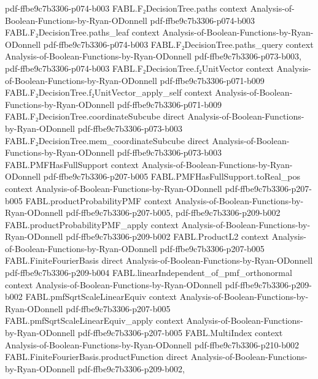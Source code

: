 \begin{theorem}
  {pdf-ffbe9c7b3306-p074-b003}
\proofstep
  {FABL.F₂DecisionTree.paths}
  {context}
  {Analysis-of-Boolean-Functions-by-Ryan-ODonnell}
  {pdf-ffbe9c7b3306-p074-b003}
\proofstep
  {FABL.F₂DecisionTree.paths_leaf}
  {context}
  {Analysis-of-Boolean-Functions-by-Ryan-ODonnell}
  {pdf-ffbe9c7b3306-p074-b003}
\proofstep
  {FABL.F₂DecisionTree.paths_query}
  {context}
  {Analysis-of-Boolean-Functions-by-Ryan-ODonnell}
  {pdf-ffbe9c7b3306-p073-b003,
    pdf-ffbe9c7b3306-p074-b003}
\proofstep
  {FABL.F₂DecisionTree.f₂UnitVector}
  {context}
  {Analysis-of-Boolean-Functions-by-Ryan-ODonnell}
  {pdf-ffbe9c7b3306-p071-b009}
\proofstep
  {FABL.F₂DecisionTree.f₂UnitVector_apply_self}
  {context}
  {Analysis-of-Boolean-Functions-by-Ryan-ODonnell}
  {pdf-ffbe9c7b3306-p071-b009}
\proofstep
  {FABL.F₂DecisionTree.coordinateSubcube}
  {direct}
  {Analysis-of-Boolean-Functions-by-Ryan-ODonnell}
  {pdf-ffbe9c7b3306-p073-b003}
\proofstep
  {FABL.F₂DecisionTree.mem_coordinateSubcube}
  {direct}
  {Analysis-of-Boolean-Functions-by-Ryan-ODonnell}
  {pdf-ffbe9c7b3306-p073-b003}
\proofstep
  {FABL.PMFHasFullSupport}
  {context}
  {Analysis-of-Boolean-Functions-by-Ryan-ODonnell}
  {pdf-ffbe9c7b3306-p207-b005}
\proofstep
  {FABL.PMFHasFullSupport.toReal_pos}
  {context}
  {Analysis-of-Boolean-Functions-by-Ryan-ODonnell}
  {pdf-ffbe9c7b3306-p207-b005}
\proofstep
  {FABL.productProbabilityPMF}
  {context}
  {Analysis-of-Boolean-Functions-by-Ryan-ODonnell}
  {pdf-ffbe9c7b3306-p207-b005,
    pdf-ffbe9c7b3306-p209-b002}
\proofstep
  {FABL.productProbabilityPMF_apply}
  {context}
  {Analysis-of-Boolean-Functions-by-Ryan-ODonnell}
  {pdf-ffbe9c7b3306-p209-b002}
\proofstep
  {FABL.ProductL2}
  {context}
  {Analysis-of-Boolean-Functions-by-Ryan-ODonnell}
  {pdf-ffbe9c7b3306-p207-b005}
\proofstep
  {FABL.FiniteFourierBasis}
  {direct}
  {Analysis-of-Boolean-Functions-by-Ryan-ODonnell}
  {pdf-ffbe9c7b3306-p209-b004}
\proofstep
  {FABL.linearIndependent_of_pmf_orthonormal}
  {context}
  {Analysis-of-Boolean-Functions-by-Ryan-ODonnell}
  {pdf-ffbe9c7b3306-p209-b002}
\proofstep
  {FABL.pmfSqrtScaleLinearEquiv}
  {context}
  {Analysis-of-Boolean-Functions-by-Ryan-ODonnell}
  {pdf-ffbe9c7b3306-p207-b005}
\proofstep
  {FABL.pmfSqrtScaleLinearEquiv_apply}
  {context}
  {Analysis-of-Boolean-Functions-by-Ryan-ODonnell}
  {pdf-ffbe9c7b3306-p207-b005}
\proofstep
  {FABL.MultiIndex}
  {context}
  {Analysis-of-Boolean-Functions-by-Ryan-ODonnell}
  {pdf-ffbe9c7b3306-p210-b002}
\proofstep
  {FABL.FiniteFourierBasis.productFunction}
  {direct}
  {Analysis-of-Boolean-Functions-by-Ryan-ODonnell}
  {pdf-ffbe9c7b3306-p209-b002,
}
\end{theorem}
